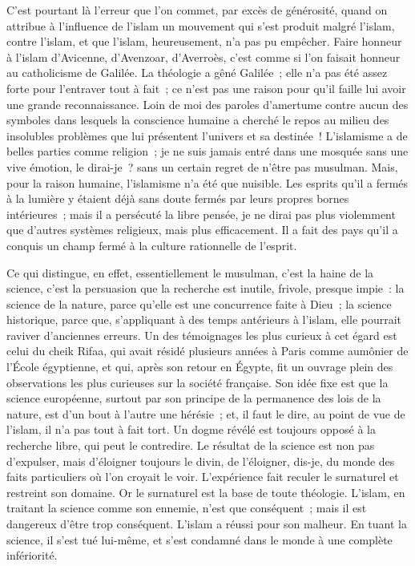 \documentclass[french,twoside]{book} %
\newcommand\orgName[1]{#1}
\newcommand\persName[1]{#1}
\newcommand\placeName[1]{#1}
\begin{document}
C’est pourtant là l’erreur que l’on commet, par excès de générosité, quand on attribue à l’influence de l’islam un mouvement qui s’est produit malgré l’islam, contre l’islam, et que l’islam, heureusement, n’a pas pu empêcher. Faire honneur à l’islam d’{\persName Avicenne}, d’{\persName Avenzoar}, d’{\persName Averroès}, c’est comme si l’on faisait honneur au catholicisme de {\persName Galilée}. La théologie a gêné {\persName Galilée} ; elle n’a pas été assez forte pour l’entraver tout à fait ; ce n’est pas une raison pour qu’il faille lui avoir une grande reconnaissance. Loin de moi des paroles d’amertume contre aucun des symboles dans lesquels la conscience humaine a cherché le repos au milieu des insolubles problèmes que lui présentent l’univers et sa destinée ! L’islamisme a de belles parties comme religion ; je ne suis jamais entré dans une mosquée sans une vive émotion, le dirai-je ? sans un certain regret de n’être pas musulman. Mais, pour la raison humaine, l’islamisme n’a été que nuisible. Les esprits qu’il a fermés à la lumière y étaient déjà sans doute fermés par leurs propres bornes intérieures ; mais il a persécuté la libre pensée, je ne dirai pas plus violemment que d’autres systèmes religieux, mais plus efficacement. Il a fait des pays qu’il a conquis un champ fermé à la culture rationnelle de l’esprit.\par
Ce qui distingue, en effet, essentiellement le musulman, c’est la haine de la science, c’est la persuasion que la recherche est inutile, frivole, presque impie : la science de la nature, parce qu’elle est une concurrence faite à {\persName Dieu} ; la science historique, parce que, s’appliquant à des temps antérieurs à l’islam, elle pourrait raviver d’anciennes erreurs. Un des témoignages les plus curieux à cet égard est celui du {\persName cheik Rifaa}, qui avait résidé plusieurs années à {\placeName Paris} comme aumônier de l’{\orgName École égyptienne}, et qui, après son retour en {\placeName Égypte}, fit un ouvrage plein des observations les plus curieuses sur la société française. Son idée fixe est que la science européenne, surtout par son principe de la permanence des lois de la nature, est d’un bout à l’autre une hérésie ; et, il faut le dire, au point de vue de l’islam, il n’a pas tout à fait tort. Un dogme révélé est toujours opposé à la recherche libre, qui peut le contredire. Le résultat de la science est non pas d’expulser, mais d’éloigner toujours le divin, de l’éloigner, dis-je, du monde des faits particuliers où l’on croyait le voir. L’expérience fait reculer le surnaturel et restreint son domaine. Or le surnaturel est la base de toute théologie. L’islam, en traitant la science comme son ennemie, n’est que conséquent ; mais il est dangereux d’être trop conséquent. L’islam a réussi pour son malheur. En tuant la science, il s’est tué lui-même, et s’est condamné dans le monde à une complète infériorité.\par
\end{document}
